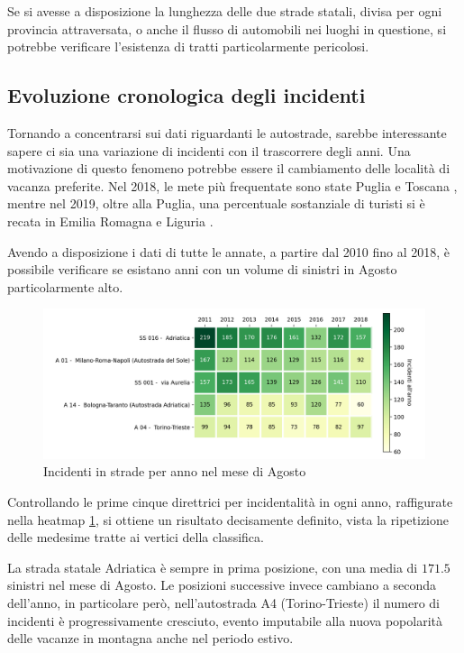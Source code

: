 \documentclass[a4paper,12pt]{report}
\begin{document}
Se si avesse a disposizione la lunghezza delle due strade statali, 
divisa per ogni provincia attraversata,
o anche il flusso di automobili nei luoghi in questione, 
si potrebbe verificare l'esistenza di tratti particolarmente pericolosi. 


\subsection{Evoluzione cronologica degli incidenti}

Tornando a concentrarsi sui dati riguardanti le autostrade, 
sarebbe interessante sapere ci sia una variazione di incidenti con il trascorrere degli anni. 
Una motivazione di questo fenomeno potrebbe essere il cambiamento 
delle località di vacanza preferite. 
Nel 2018, le mete più frequentate sono state Puglia e 
Toscana \cite{INFOGRAFICA_ISTAT:1}, mentre nel 2019, oltre alla Puglia, 
una percentuale sostanziale di turisti si è recata in 
Emilia Romagna e Liguria \cite{REPORT_ISTAT_2019:1}. 

Avendo a disposizione i dati di tutte le annate, a partire dal 2010 fino al 2018, 
è possibile verificare se esistano anni con un volume di 
sinistri in Agosto particolarmente alto. 

\begin{figure}
    \includegraphics[width=\linewidth]{../src/incidenti/incidenti_aci/agosto/vacanze_autostrade.png}
    \caption{Incidenti in strade per anno nel mese di Agosto}
    \label{fig:autostrade-anno}
\end{figure}

Controllando le prime cinque direttrici per incidentalità in ogni anno, 
raffigurate nella heatmap \ref{fig:autostrade-anno}, si ottiene 
un risultato decisamente definito, vista la ripetizione delle medesime 
tratte ai vertici della classifica.

La strada statale Adriatica è sempre in prima posizione, con una media di $171.5$ 
sinistri nel mese di Agosto. 
Le posizioni successive invece cambiano a seconda dell'anno, in particolare però, 
nell'autostrada A4 (Torino-Trieste) il numero di incidenti è progressivamente cresciuto, 
evento imputabile alla nuova popolarità delle vacanze in montagna anche nel periodo estivo. 
\end{document}
